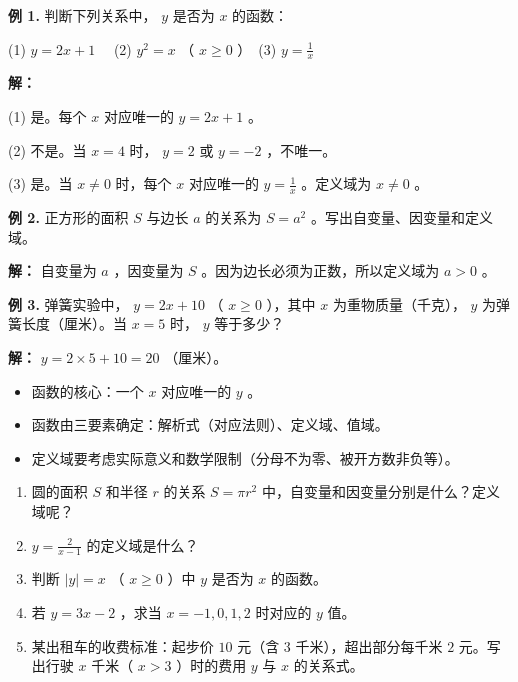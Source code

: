 \begin{workedexamples}


\textbf{例 1.} 判断下列关系中， $y$ 是否为 $x$ 的函数：

(1) $y = 2x + 1$ 　(2) $y^2 = x$ （ $x \geq 0$ ）　(3) $y = \frac{1}{x}$

\textbf{解：}

(1) 是。每个 $x$ 对应唯一的 $y = 2x + 1$ 。

(2) 不是。当 $x = 4$ 时， $y = 2$ 或 $y = -2$ ，不唯一。

(3) 是。当 $x \neq 0$ 时，每个 $x$ 对应唯一的 $y = \frac{1}{x}$ 。定义域为 $x \neq 0$ 。

\textbf{例 2.} 正方形的面积 $S$ 与边长 $a$ 的关系为 $S = a^2$ 。写出自变量、因变量和定义域。

\textbf{解：} 自变量为 $a$ ，因变量为 $S$ 。因为边长必须为正数，所以定义域为 $a > 0$ 。

\textbf{例 3.} 弹簧实验中， $y = 2x + 10$ （ $x \geq 0$ ），其中 $x$ 为重物质量（千克）， $y$ 为弹簧长度（厘米）。当 $x = 5$ 时， $y$ 等于多少？

\textbf{解：} $y = 2 \times 5 + 10 = 20$ （厘米）。

\end{workedexamples}

\begin{keytakeaway}


\begin{itemize}
  \item 函数的核心：一个 $x$ 对应唯一的 $y$ 。
  \item 函数由三要素确定：解析式（对应法则）、定义域、值域。
  \item 定义域要考虑实际意义和数学限制（分母不为零、被开方数非负等）。
\end{itemize}


\end{keytakeaway}

\begin{practice}


\begin{enumerate}
  \item 圆的面积 $S$ 和半径 $r$ 的关系 $S = \pi r^2$ 中，自变量和因变量分别是什么？定义域呢？
  \item $y = \frac{2}{x - 1}$ 的定义域是什么？
  \item 判断 $\lvert y \rvert = x$ （ $x \geq 0$ ）中 $y$ 是否为 $x$ 的函数。
  \item 若 $y = 3x - 2$ ，求当 $x = -1, 0, 1, 2$ 时对应的 $y$ 值。
  \item 某出租车的收费标准：起步价 $10$ 元（含 $3$ 千米），超出部分每千米 $2$ 元。写出行驶 $x$ 千米（ $x > 3$ ）时的费用 $y$ 与 $x$ 的关系式。
\end{enumerate}


\end{practice}

